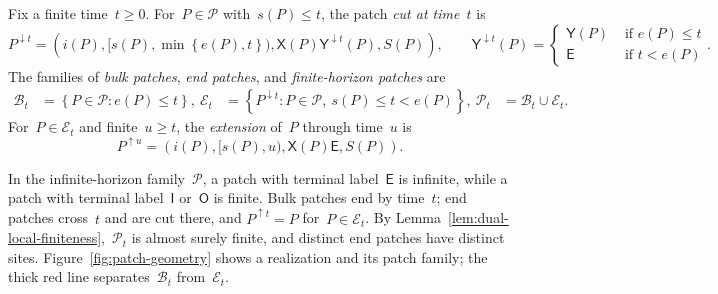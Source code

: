 \documentclass[EJP,preprint,NODS,nobera]{ejpecp}
\newcommand{\bb}[1]{\left(#1\right)}
\newcommand{\cb}[1]{\left\{#1\right\}}
\newcommand{\pw}[4]{\left\{\begin{array}{cl}
  #1 &\text{ if } #2 \\
  #3 &\text{ if } #4
\end{array}\right.}
\newcommand{\chg}[1]{{\color{changegreen}#1}}
\begin{document}
\chg{\begin{definition}
\label{def:bulk-end-patches}
Fix a finite time~$t\geq0$. For~$P\in\mathcal P$ with~$s(P)\leq t$, the patch
\emph{cut at time~$t$} is
\begin{equation*}
P^{\downarrow t}
=
\bb{
 i(P),
 [s(P),\min\cb{e(P),t}),
 \mathsf X(P)\mathsf Y^{\downarrow t}(P),
 S(P)
},
\qquad
\mathsf Y^{\downarrow t}(P)
=
\pw{\mathsf Y(P)}{e(P)\leq t}{\mathsf E}{t<e(P)}.
\end{equation*}
The families of \emph{bulk patches}, \emph{end patches}, and
\emph{finite-horizon patches} are
\begin{align*}
\mathcal B_t
&=
\cb{P\in\mathcal P:e(P)\leq t},
\
\mathcal E_t
&=
\cb{P^{\downarrow t}:P\in\mathcal P,\ s(P)\leq t<e(P)},
\
\mathcal P_t
&=
\mathcal B_t\cup\mathcal E_t.
\end{align*}
For~$P\in\mathcal E_t$ and finite~$u\geq t$, the \emph{extension} of~$P$
through time~$u$ is
\begin{equation}
\label{eq:geometric-patch-extension}
P^{\uparrow u}
=
\bb{i(P),[s(P),u),\mathsf X(P)\mathsf E,S(P)}.
\end{equation}
\end{definition}

\begin{remark}
In the infinite-horizon family~$\mathcal P$, a patch with terminal
label~$\mathsf E$ is infinite, while a patch with terminal label~$\mathsf I$
or~$\mathsf O$ is finite. Bulk patches end by time~$t$; end patches cross~$t$ and are cut there, and
$P^{\uparrow t}=P$ for~$P\in\mathcal E_t$. By
Lemma~\ref{lem:dual-local-finiteness},~$\mathcal P_t$ is almost surely
finite, and distinct end patches have distinct sites.
Figure~\ref{fig:patch-geometry} shows a realization and its patch family; the
thick red line separates~$\mathcal B_t$ from~$\mathcal E_t$.
\end{remark}}
\end{document}
